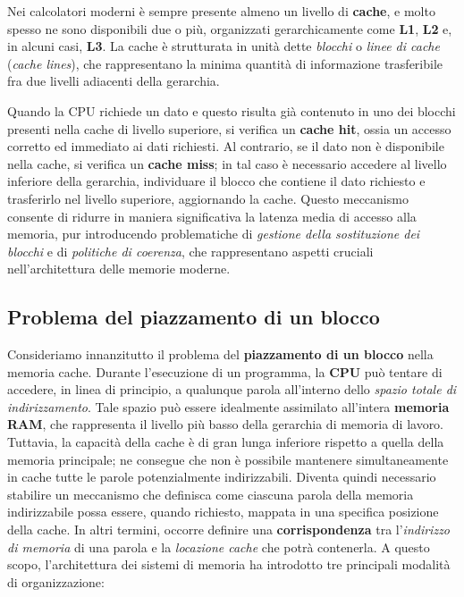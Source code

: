 \noindent
Nei calcolatori moderni è sempre presente almeno un livello di \textbf{cache}, e molto spesso ne sono disponibili due o più, organizzati gerarchicamente come \textbf{L1}, \textbf{L2} e, in alcuni casi, \textbf{L3}. La cache è strutturata in unità dette \textit{blocchi} o \textit{linee di cache} (\textit{cache lines}), che rappresentano la minima quantità di informazione trasferibile fra due livelli adiacenti della gerarchia.  

\noindent
Quando la CPU richiede un dato e questo risulta già contenuto in uno dei blocchi presenti nella cache di livello superiore, si verifica un \textbf{cache hit}, ossia un accesso corretto ed immediato ai dati richiesti. Al contrario, se il dato non è disponibile nella cache, si verifica un \textbf{cache miss}; in tal caso è necessario accedere al livello inferiore della gerarchia, individuare il blocco che contiene il dato richiesto e trasferirlo nel livello superiore, aggiornando la cache. Questo meccanismo consente di ridurre in maniera significativa la latenza media di accesso alla memoria, pur introducendo problematiche di \textit{gestione della sostituzione dei blocchi} e di \textit{politiche di coerenza}, che rappresentano aspetti cruciali nell'architettura delle memorie moderne.

\subsection{Problema del piazzamento di un blocco}
Consideriamo innanzitutto il problema del \textbf{piazzamento di un blocco} nella memoria cache. Durante l'esecuzione di un programma, la \textbf{CPU} può tentare di accedere, in linea di principio, a qualunque parola all'interno dello \textit{spazio totale di indirizzamento}. Tale spazio può essere idealmente assimilato all'intera \textbf{memoria RAM}, che rappresenta il livello più basso della gerarchia di memoria di lavoro. Tuttavia, la capacità della cache è di gran lunga inferiore rispetto a quella della memoria principale; ne consegue che non è possibile mantenere simultaneamente in cache tutte le parole potenzialmente indirizzabili.  
Diventa quindi necessario stabilire un meccanismo che definisca come ciascuna parola della memoria indirizzabile possa essere, quando richiesto, mappata in una specifica posizione della cache. In altri termini, occorre definire una \textbf{corrispondenza} tra l'\textit{indirizzo di memoria} di una parola e la \textit{locazione cache} che potrà contenerla.  
A questo scopo, l'architettura dei sistemi di memoria ha introdotto tre principali modalità di organizzazione:  

